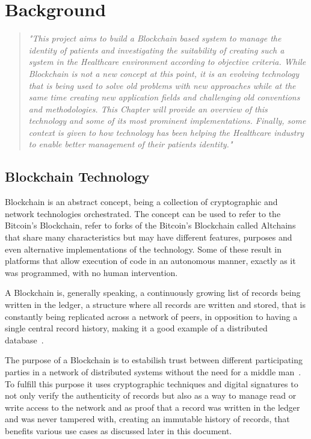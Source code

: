 \chapter{Background}\label{background}


\begin{quote} \emph{"This project aims to build a Blockchain based system to
  manage the identity of patients and investigating the suitability of creating
  such a system in the Healthcare environment according to objective criteria.
  While Blockchain is not a new concept at this point, it is an evolving
  technology that is being used to solve old problems with new approaches while
  at the same time creating new application fields and challenging old
  conventions and methodologies. This Chapter will provide an overview of this
  technology and some of its most prominent implementations. Finally, some
  context is given to how technology has been helping the Healthcare industry
  to enable better management of their patients identity."}
\end{quote}

\section{Blockchain Technology}

Blockchain is an abstract concept, being a collection of cryptographic and
network technologies orchestrated. The concept can be used to refer to the
Bitcoin's Blockchain, refer to forks of the Bitcoin's Blockchain called
Altchains~\cite{Lewis2015} that share many characteristics but may have
different features, purposes and even alternative implementations of the
technology. Some of these result in platforms that allow execution of code in
an autonomous manner, exactly as it was programmed, with no human intervention.

A Blockchain is, generally speaking, a continuously growing list of records
being written in the ledger, a structure where all records are written and
stored, that is constantly being replicated across a network of peers, in
opposition to having a single central record history, making it a good example
of a distributed database~\cite{Barclay2017}.

The purpose of a Blockchain is to estabilish trust between different
participating parties in a network of distributed systems without the need for
a middle man~\cite{Drescher2017}. To fulfill this purpose it uses cryptographic
techniques and digital signatures to not only verify the authenticity of
records but also as a way to manage read or write access to the network and as
proof that a record was written in the ledger and was never tampered with,
creating an immutable history of records, that benefits various use cases as
discussed later in this document.

